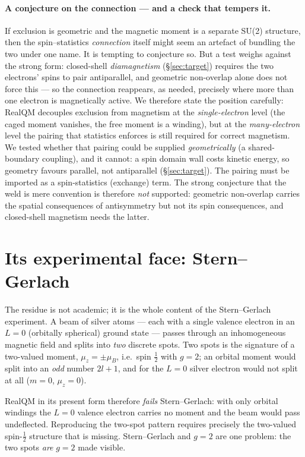 \documentclass[11pt]{article}
\begin{document}
\paragraph{A conjecture on the connection --- and a check that tempers it.} If exclusion is geometric and
the magnetic moment is a separate SU(2) structure, then the spin--statistics \emph{connection} itself
might seem an artefact of bundling the two under one name. It is tempting to conjecture so. But a test
weighs against the strong form: closed-shell \emph{diamagnetism} (\S\ref{sec:target}) requires the two
electrons' spins to pair antiparallel, and geometric non-overlap alone does not force this --- so the
connection reappears, as needed, precisely where more than one electron is magnetically active. We
therefore state the position carefully: RealQM decouples exclusion from magnetism at the
\emph{single-electron} level (the caged moment vanishes, the free moment is a winding), but at the
\emph{many-electron} level the pairing that statistics enforces is still required for correct magnetism.
We tested whether that pairing could be supplied \emph{geometrically} (a shared-boundary coupling), and
it cannot: a spin domain wall costs kinetic energy, so geometry favours parallel, not antiparallel
(\S\ref{sec:target}). The pairing must be imported as a spin-statistics (exchange) term. The strong
conjecture that the weld is mere convention is therefore \emph{not} supported: geometric non-overlap
carries the spatial consequences of antisymmetry but not its spin consequences, and closed-shell
magnetism needs the latter.

\section{Its experimental face: Stern--Gerlach}
\label{sec:sg}

The residue is not academic; it is the whole content of the Stern--Gerlach experiment. A beam of silver
atoms --- each with a single valence electron in an $L=0$ (orbitally spherical) ground state --- passes
through an inhomogeneous magnetic field and splits into \emph{two} discrete spots. Two spots is the
signature of a two-valued moment, $\mu_z=\pm\mu_B$, i.e.\ spin $\tfrac12$ with $g=2$; an orbital moment
would split into an \emph{odd} number $2l+1$, and for the $L=0$ silver electron would not split at all
($m=0$, $\mu_z=0$).

RealQM in its present form therefore \emph{fails} Stern--Gerlach: with only orbital windings the $L=0$
valence electron carries no moment and the beam would pass undeflected. Reproducing the two-spot pattern
requires precisely the two-valued spin-$\tfrac12$ structure that is missing. Stern--Gerlach and $g=2$ are
one problem: the two spots \emph{are} $g=2$ made visible.
\end{document}
